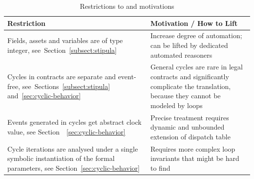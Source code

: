 \begin{table}[t]
\begin{center}
{\small
  \begin{tabular}{p{}@{\quad\;}p{}@{}}
    \hline  
    {\bf Restriction} & {\bf Motivation / How to Lift}\\
    \hline
    Fields, assets and variables are of type integer, see~Section~\ref{subsect:stipula}
    &
    Increase degree of automation; can be lifted by dedicated automated reasoners
    \\[1ex]
    Cycles in contracts are separate and event-free, see~Sections~\ref{subsect:stipula} and~\ref{sec:cyclic-behavior}
    &
    General cycles are rare in legal contracts and significantly complicate the translation, because they cannot be modeled by loops
    \\[1ex]
    Events generated in cycles get abstract clock value, see Section~~\ref{sec:cyclic-behavior}
    &
    Precise treatment requires dynamic and unbounded extension of dispatch table
    \\[1ex]  
    Cycle iterations are analysed under a single symbolic instantiation of the formal parameters, see
    Section~\ref{sec:cyclic-behavior}
    &
    Requires more complex loop invariants that might be hard to find\\
    \hline
  \end{tabular}
}
\end{center}
\caption{\label{tab:restrictions} Restrictions to {\Stipula} and motivations} 
\vspace{-.5cm}
\end{table}

